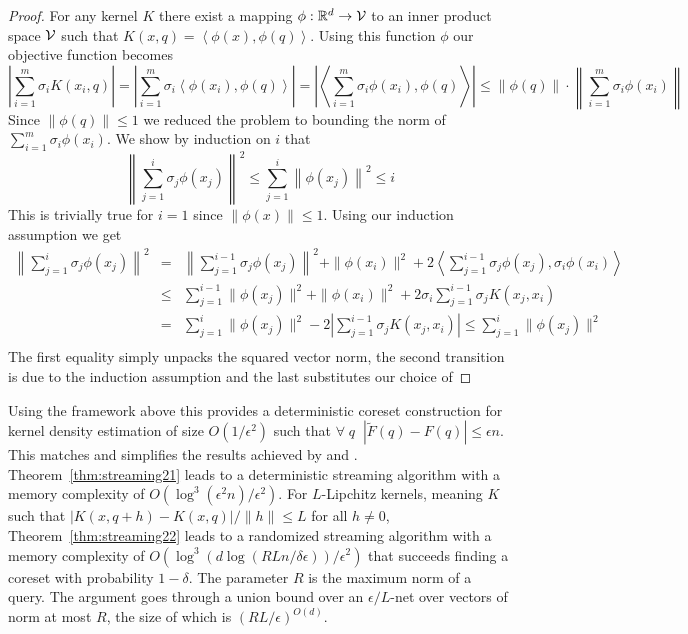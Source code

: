 \documentclass[anon,12pt]{colt2019} %
\newcommand{\ip}[1]{\left \langle #1 \right \rangle}
\newcommand{\R}{\mathbb{R}}
\newcommand{\eps}{\epsilon}
\begin{document}
\begin{proof}
For any kernel $K$ there exist a mapping $\phi: \R^d \to {\cal V}$ to an inner product space $\cal V$ such that 
$ K(x,q) = \ip{\phi(x), \phi(q)} $.
Using this function $\phi$ our objective function becomes
\[
|\sum_{i=1}^m \sigma_i K(x_i,q)| = |\sum_{i=1}^m \sigma_i \ip{\phi(x_i), \phi(q)} | = \left| \ip{ \sum_{i=1}^m \sigma_i \phi(x_i), \phi(q)}\right| \leq  \|\phi(q)\| \cdot \left\|  \sum_{i=1}^m \sigma_i \phi(x_i) \right\| 
\]
Since $\|\phi(q)\| \leq 1$ we reduced the problem to bounding the norm of $ \sum_{i=1}^m \sigma_i \phi(x_i) $.
%
We show by induction on $i$ that 
$$\left\| \sum_{j=1}^i \sigma_j \phi(x_j) \right\|^2 \le \sum_{j=1}^i \left\|\phi(x_j)\right\|^2 \leq i$$
This is trivially true for $i=1$ since $\|\phi(x)\| \leq 1$. 
Using our induction assumption we get
\begin{eqnarray*}
\left\| \sum_{j=1}^{i}\sigma_j \phi(x_j)\right\|^2 &=& \left\|\sum_{j=1}^{i-1}\sigma_j \phi(x_j)\right\|^2 + \|\phi(x_i)\|^2 + 2\ip{ \sum_{j=1}^{i-1}\sigma_j \phi(x_j), \sigma_i \phi(x_i)} \\
&\le& \sum_{j=1}^{i-1} \|\phi(x_j)\|^2 + \|\phi(x_i)\|^2 + 2\sigma_i \sum_{j=1}^{i-1}\sigma_j K(x_j, x_i)\\
&=& \sum_{j=1}^{i} \|\phi(x_j)\|^2 - 2\left| \sum_{j=1}^{i-1}\sigma_j K(x_j, x_i) \right| \le \sum_{j=1}^{i} \|\phi(x_j)\|^2 \\
\end{eqnarray*}
The first equality simply unpacks the squared vector norm, the second transition is due to the induction assumption and the last substitutes our choice of %
\end{proof}

Using the framework above this provides a deterministic coreset construction for kernel density estimation of size $O(1/\eps^2)$ such that $\forall \;q\;\; |\tilde F(q) - F(q)| \le \eps n$. This matches and simplifies the results achieved by \cite{DBLP:conf/soda/PhillipsT18} and \cite{DBLP:journals/corr/abs-1802-01751}. Theorem~\ref{thm:streaming21} leads to a deterministic streaming algorithm with a memory complexity of $O(\log^3(\eps^2 n)/\eps^2)$. For $L$-Lipchitz kernels, meaning $K$ such that $|K(x,q+h) - K(x,q)|/\|h\| \leq L$ for all $h \neq 0$, Theorem~\ref{thm:streaming22} leads to a randomized streaming algorithm with a memory complexity of $O\left(\log^3 \left( d \log\left(RLn/\delta\eps\right) \right) / \eps^2 \right)$ that succeeds finding a coreset with probability $1-\delta$. The parameter $R$ is the maximum norm of a query. The argument goes through a union bound over an $\eps/L$-net over vectors of norm at most $R$, the size of which is $(RL/\eps)^{O(d)}$.
\end{document}
